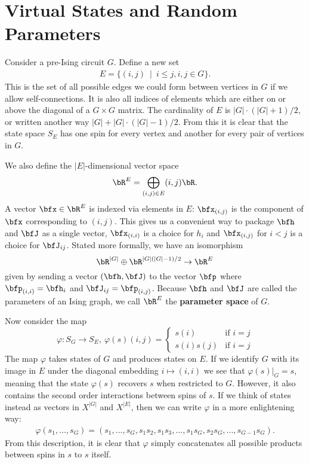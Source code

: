 \documentclass[raggedright, nofonts, notitlepage, openany, debug]{tufte-book}
\begin{document}
\chapter{Virtual States and Random Parameters}
Consider a pre-Ising circuit $G$. Define a new set
\begin{align*}
  E = \{(i,j) ~ \mid ~ i \leq j, i,j \in G\}.
\end{align*}
This is the set of all possible edges we could form between vertices in $G$ if we allow self-connections. It is also all indices of elements which are either on or above the diagonal of a $G\times G$ matrix. The cardinality of $E$ is $|G|\cdot(|G|+1)/2$, or written another way $|G| + |G|\cdot(|G|-1)/2$. From this it is clear that the state space $S_E$ has one spin for every vertex and another for every pair of vertices in $G$.

We also define the $|E|$-dimensional vector space
\begin{align*}
  \bR^E = \bigoplus_{(i,j) \in E} (i,j)\bR.
\end{align*}
A vector $\bfx \in \bR^E$ is indexed via elements in $E$: $\bfx_{(i,j)}$ is the component of $\bfx$ corresponding to $(i,j)$. This gives us a convenient way to package $\bfh$ and $\bfJ$ as a single vector, $\bfx_{(i,i)}$ is a choice for $h_i$ and $\bfx_{(i,j)}$ for $i < j$ is a choice for $\bfJ_{ij}$. Stated more formally, we have an isomorphism
\begin{equation}\label{eqn:parameter_space_iso}
  \bR^{|G|} \oplus \bR^{|G|(|G| - 1)/2}\to \bR^E
\end{equation}
given by sending a vector $(\bfh, \bfJ)$ to the vector $\bfp$ where $\bfp_{(i,i)} = \bfh_i$ and $\bfJ_{ij} = \bfp_{(i,j)}$. Because $\bfh$ and $\bfJ$ are called the parameters of an Ising graph, we call $\bR^E$ the \textbf{parameter space} of $G$.

Now consider the map
\begin{equation}\label{eqn:virtual-map}
  \varphi:S_G \to S_E, ~\varphi(s)(i,j) = 
  \begin{cases}
    s(i) & \text{if } i = j \\
    s(i)s(j) & \text{if } i = j
  \end{cases}
\end{equation}
The map $\varphi$ takes states of $G$ and produces states on $E$. If we identify $G$ with its image in $E$ under the diagonal embedding $i \mapsto (i,i)$ we see that $\varphi(s)|_{G} = s$, meaning that the state $\varphi(s)$ recovers $s$ when restricted to $G$. However, it also contains the second order interactions between spins of $s$. If we think of states instead as vectors in $X^{|G|}$ and $X^{|E|}$, then we can write $\varphi$ in a more enlightening way:
\begin{align*}
\varphi(s_1,...,s_{G}) = (s_1,...,s_G,s_1s_2,s_1s_3,...,s_1s_G,s_2s_G,...,s_{G-1}s_{G}).
\end{align*}
From this description, it is clear that $\varphi$ simply concatenates all possible products between spins in $s$ to $s$ itself. 
\end{document}
